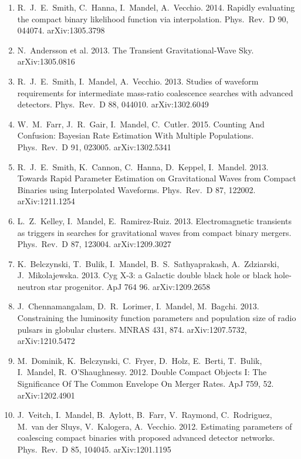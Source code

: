 \documentclass[margin,line]{res}
\begin{document}
\begin{resume}
\begin{enumerate}
\item  R.~J.~E.~Smith, C.~Hanna, I.~Mandel, A.~Vecchio.  2014.  Rapidly evaluating the compact binary likelihood function via interpolation.  Phys.~Rev.~D 90, 044074. arXiv:1305.3798

\item  N.~Andersson et al.  2013.  The Transient Gravitational-Wave Sky.  arXiv:1305.0816

\item  R.~J.~E.~Smith, I.~Mandel, A.~Vecchio. 2013.  Studies of waveform requirements for intermediate mass-ratio coalescence searches with advanced detectors. Phys.~Rev.~D 88, 044010.  arXiv:1302.6049

\item  W.~M.~Farr, J.~R.~Gair, I.~Mandel, C.~Cutler.  2015.  Counting And Confusion: Bayesian Rate Estimation With Multiple Populations.  Phys.~Rev.~D 91, 023005. arXiv:1302.5341

\item  R.~J.~E.~Smith, K.~Cannon, C.~Hanna, D.~Keppel, I.~Mandel. 2013. Towards Rapid Parameter Estimation on Gravitational Waves from Compact Binaries using Interpolated Waveforms.  Phys.~Rev.~D 87, 122002.  arXiv:1211.1254

\item  L.~Z.~Kelley, I.~Mandel, E.~Ramirez-Ruiz. 2013.  Electromagnetic transients as triggers in searches for gravitational waves from compact binary mergers. Phys.~Rev.~D 87, 123004.  arXiv:1209.3027

\item  K.~Belczynski, T.~Bulik, I.~Mandel, B.~S.~Sathyaprakash, A.~Zdziarski, J.~Mikolajewska. 2013. Cyg X-3: a Galactic double black hole or black hole-neutron star progenitor. ApJ 764 96. arXiv:1209.2658

\item  J.~Chennamangalam, D.~R.~Lorimer, I.~Mandel, M.~Bagchi.  2013. Constraining the luminosity function parameters and population size of radio pulsars in globular clusters.  MNRAS 431, 874.  arXiv:1207.5732, arXiv:1210.5472

\item  M.~Dominik, K.~Belczynski, C.~Fryer, D.~Holz, E.~Berti, T.~Bulik, I.~Mandel, R.~O'Shaughnessy.  2012.  Double Compact Objects I: The Significance Of The Common Envelope On Merger Rates.  ApJ 759, 52.  arXiv:1202.4901

\item  J.~Veitch, I.~Mandel, B.~Aylott, B.~Farr, V.~Raymond, C.~Rodriguez, M.~van der Sluys, V.~Kalogera, A.~Vecchio.  2012.  Estimating parameters of coalescing compact binaries with proposed advanced detector networks. Phys.~Rev.~D 85, 104045. arXiv:1201.1195


\end{enumerate}
\end{resume}
\end{document}
